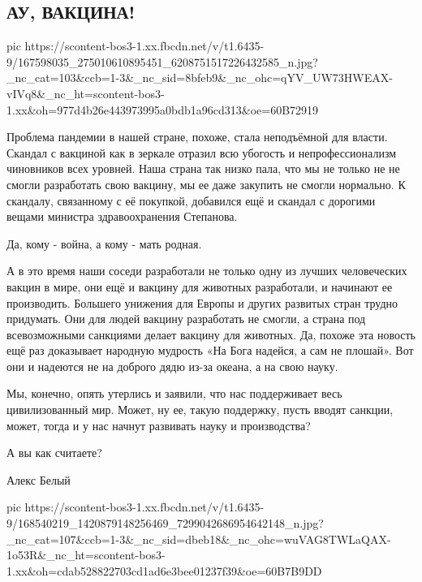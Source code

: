  
 
 
 
 
\subsection{АУ, ВАКЦИНА!}

\ifcmt
  pic https://scontent-bos3-1.xx.fbcdn.net/v/t1.6435-9/167598035_275010610895451_6208751517226432585_n.jpg?_nc_cat=103&ccb=1-3&_nc_sid=8bfeb9&_nc_ohc=qYV_UW73HWEAX-vIVq8&_nc_ht=scontent-bos3-1.xx&oh=977d4b26e443973995a0bdb1a96cd313&oe=60B72919
\fi

Проблема пандемии в нашей стране, похоже, стала неподъёмной для власти. Скандал
с вакциной как в зеркале отразил всю убогость и непрофессионализм чиновников
всех уровней. Наша страна так низко пала, что мы не только не не смогли
разработать свою вакцину, мы ее даже закупить не смогли нормально. К скандалу,
связанному с её покупкой, добавился ещё и скандал с дорогими вещами министра
здравоохранения Степанова. 

Да, кому - война, а кому - мать родная. 

А в это время наши соседи разработали не только одну из лучших человеческих
вакцин в мире, они ещё и вакцину для животных разработали, и начинают ее
производить. Большего унижения для Европы и других развитых стран трудно
придумать. Они для людей вакцину разработать не смогли, а страна под
всевозможными санкциями делает вакцину для животных.   Да, похоже эта новость
ещё раз доказывает народную мудрость «На Бога надейся, а сам не плошай». Вот
они и надеются не на доброго дядю из-за океана, а на свою науку. 

Мы, конечно, опять утерлись и заявили, что нас поддерживает весь цивилизованный
мир. Может, ну ее, такую поддержку, пусть вводят санкции, может,  тогда и у нас
начнут развивать науку и производства?

А вы как считаете?

Алекс Белый


\ifcmt
  pic https://scontent-bos3-1.xx.fbcdn.net/v/t1.6435-9/168540219_1420879148256469_7299042686954642148_n.jpg?_nc_cat=107&ccb=1-3&_nc_sid=dbeb18&_nc_ohc=wuVAG8TWLaQAX-1o53R&_nc_ht=scontent-bos3-1.xx&oh=cdab528822703cd1ad6e3bee01237f39&oe=60B7B9DD
\fi

